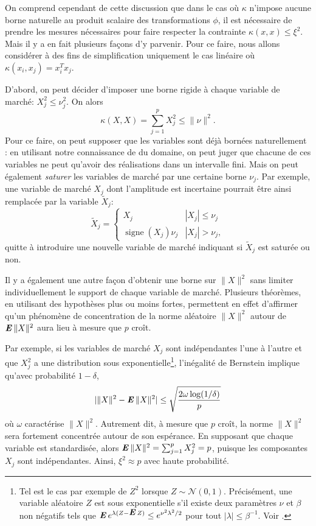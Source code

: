 On comprend cependant de cette discussion que dans le cas où $\kappa$ n'impose aucune borne
naturelle au produit scalaire des transformations $\phi$, il est nécessaire de prendre les
mesures nécessaires pour faire respecter la contrainte $\kappa(x,x)\leq\xi^2$. Mais il y a en fait
plusieurs façons d'y parvenir. Pour ce faire, nous allons considérer à
des fins de simplification uniquement le cas linéaire où $\kappa(x_i,x_j) = x_i^Tx_j$.

D'abord, on peut décider d'imposer une borne rigide à chaque variable de marché: $X_j^2 \leq
\nu_j^2$. On alors 
\begin{equation}
  \kappa(X,X) = \sum_{j=1}^p X_j^2 \leq \|\nu\|^2.
\end{equation}
Pour ce faire, on peut supposer que les variables sont déjà bornées naturellement : en
utilisant notre connaissance de du domaine, on peut juger que chacune de ces variables ne
peut qu'avoir des réalisations dans un intervalle fini. Mais on peut également
\textit{saturer} les variables de marché par une certaine borne $\nu_j$. Par exemple, une
variable de marché $X_j$ dont l'amplitude est incertaine pourrait être ainsi remplacée par la
variable $\tilde X_j$:
\begin{equation}
  \tilde X_j = \begin{cases}
    X_j & |X_j| \leq \nu_j\\
     \operatorname{signe}(X_j)\nu_j & |X_j| > \nu_j,
  \end{cases}
\end{equation}
quitte à introduire une nouvelle variable de marché indiquant si $\tilde X_j$ est saturée
ou non.

Il y a également une autre façon d'obtenir une borne sur $\|X\|^2$ sans limiter
individuellement le support de chaque variable de marché. Plusieurs théorèmes, en
utilisant des hypothèses plus ou moins fortes, permettent en effet d'affirmer qu'un
phénomène de concentration de la norme aléatoire $\|X\|^2$ autour de $\operatorname{\mbox{\textbf{\textit{E}}}}\|X\|^2$ aura lieu
à mesure que $p$ croît.

Par exemple, si les variables de marché $X_j$ sont indépendantes l'une à l'autre et que
$X_j^2$ a une distribution sous exponentielle\footnote{Tel est le cas par exemple de $Z^2$
  lorsque $Z \sim \mathscr{N}(0,1)$. Précisément, une variable aléatoire $Z$ est sous
  exponentielle s'il existe deux paramètres $\nu$ et $\beta$ non négatifs tels que
  $\operatorname{\mbox{\textbf{\textit{E}}}} e^{\lambda(Z-\operatorname{\mbox{\textbf{\textit{E}}}} Z)} \leq e^{\nu^2\lambda^2/2}$ pour tout
  $|\lambda| \leq \beta^{-1}$. Voir \cite{boucheron2013concentration}.}, l'inégalité de Bernstein
implique qu'avec probabilité $1-\delta$,
\begin{equation}
  |\|X\|^2 - \operatorname{\mbox{\textbf{\textit{E}}}}\|X\|^2| \leq \sqrt\frac{2\omega\log(1/\delta)}{p}
\end{equation}
où $\omega$ caractérise $\|X\|^2$.  Autrement dit, à mesure que $p$ croît, la norme
$\|X\|^2$ sera fortement concentrée autour de son espérance. En supposant que chaque
variable est standardisée, alors $\operatorname{\mbox{\textbf{\textit{E}}}}\|X\|^2 = \sum_{j=1}^pX_j^2 = p$, puisque les composantes
$X_j$ sont indépendantes. Ainsi, $\xi^2 \approx p$ avec haute probabilité.

